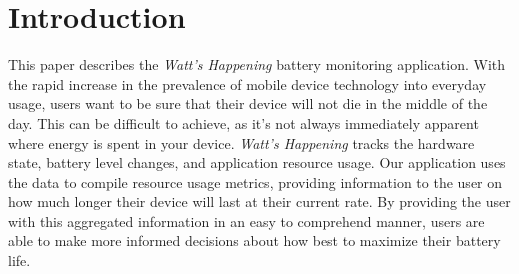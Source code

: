 \section{Introduction}
\label{sec:intro}
This paper describes the \emph{Watt's Happening} battery monitoring application. 
With the rapid increase in the prevalence of mobile device technology into everyday usage, users want to be sure that their device will not die in the middle of the day.
This can be difficult to achieve, as it's not always immediately apparent where energy is spent in your device.
\emph{Watt's Happening} tracks the hardware state, battery level changes, and application resource usage. 
Our application uses the data to compile resource usage metrics, providing information to the user on how much longer their device will last at their current rate.
By providing the user with this aggregated information in an easy to comprehend manner, users are able to make more informed decisions about how best to maximize their battery life.